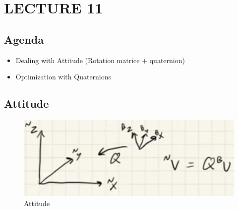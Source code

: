 \newpage
\section{LECTURE 11}

\subsection{Agenda}
\begin{itemize}
    \item Dealing with Attitude (Rotation matrice + quaternion)
    \item Optimization with Quaternions
\end{itemize}

\subsection{Attitude}

\begin{figure}
    \centering
    \includegraphics[width=0.4\linewidth]{L11_Images/F1.PNG}
    \caption{Attitude}
    \label{fig:l11f1}
\end{figure}

